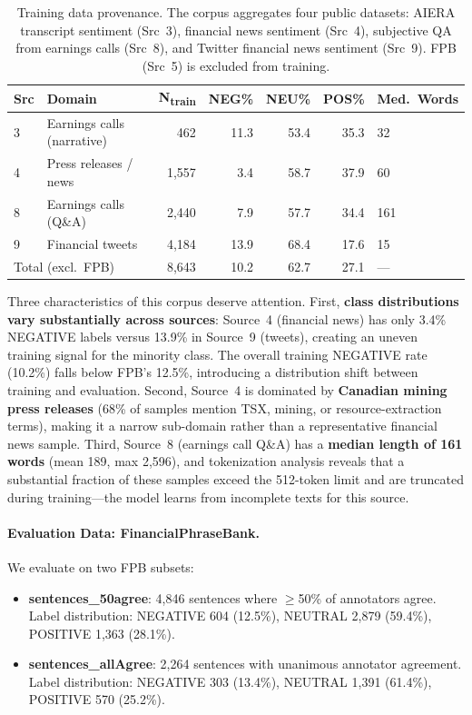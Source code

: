 \documentclass[11pt]{article}
\begin{document}
\begin{table}[h]
\centering
\caption{Training data provenance. The corpus aggregates four public datasets: AIERA transcript sentiment (Src~3), financial news sentiment (Src~4), subjective QA from earnings calls (Src~8), and Twitter financial news sentiment (Src~9). FPB (Src~5) is excluded from training.}
\label{tab:data-provenance}
\begin{tabular}{llrrrrl}
\toprule
\textbf{Src} & \textbf{Domain} & \textbf{N\textsubscript{train}} &
\textbf{NEG\%} & \textbf{NEU\%} & \textbf{POS\%} & \textbf{Med.\ Words} \\
\midrule
3 & Earnings calls (narrative) & 462 & 11.3 & 53.4 & 35.3 & 32 \\
4 & Press releases / news & 1,557 & 3.4 & 58.7 & 37.9 & 60 \\
8 & Earnings calls (Q\&A) & 2,440 & 7.9 & 57.7 & 34.4 & 161 \\
9 & Financial tweets & 4,184 & 13.9 & 68.4 & 17.6 & 15 \\
\midrule
\multicolumn{2}{l}{Total (excl.\ FPB)} & 8,643 & 10.2 & 62.7 & 27.1 & --- \\
\bottomrule
\end{tabular}
\end{table}

Three characteristics of this corpus deserve attention. First, \textbf{class distributions vary substantially across sources}: Source~4 (financial news) has only 3.4\% NEGATIVE labels versus 13.9\% in Source~9 (tweets), creating an uneven training signal for the minority class. The overall training NEGATIVE rate (10.2\%) falls below FPB's 12.5\%, introducing a distribution shift between training and evaluation. Second, Source~4 is dominated by \textbf{Canadian mining press releases} (68\% of samples mention TSX, mining, or resource-extraction terms), making it a narrow sub-domain rather than a representative financial news sample. Third, Source~8 (earnings call Q\&A) has a \textbf{median length of 161 words} (mean 189, max 2,596), and tokenization analysis reveals that a substantial fraction of these samples exceed the 512-token limit and are truncated during training---the model learns from incomplete texts for this source. %

\paragraph{Evaluation Data: FinancialPhraseBank.}
We evaluate on two FPB subsets:
\begin{itemize}[nosep]
    \item \textbf{sentences\_50agree}: 4,846 sentences where $\geq$50\% of annotators agree. Label distribution: NEGATIVE 604 (12.5\%), NEUTRAL 2,879 (59.4\%), POSITIVE 1,363 (28.1\%).
    \item \textbf{sentences\_allAgree}: 2,264 sentences with unanimous annotator agreement. Label distribution: NEGATIVE 303 (13.4\%), NEUTRAL 1,391 (61.4\%), POSITIVE 570 (25.2\%).
\end{itemize}
\end{document}
